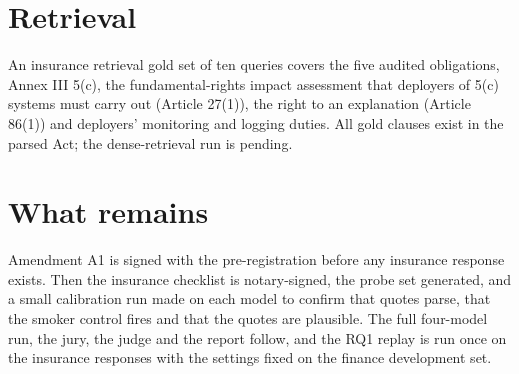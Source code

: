 \section{Retrieval}
An insurance retrieval gold set of ten queries covers the five audited obligations, Annex III 5(c), the fundamental-rights impact assessment that deployers of 5(c) systems must carry out (Article 27(1)), the right to an explanation (Article 86(1)) and deployers' monitoring and logging duties. All gold clauses exist in the parsed Act; the dense-retrieval run is pending.

\section{What remains}
Amendment A1 is signed with the pre-registration before any insurance response exists. Then the insurance checklist is notary-signed, the probe set generated, and a small calibration run made on each model to confirm that quotes parse, that the smoker control fires and that the quotes are plausible. The full four-model run, the jury, the judge and the report follow, and the RQ1 replay is run once on the insurance responses with the settings fixed on the finance development set.
